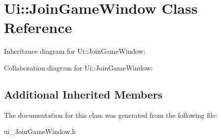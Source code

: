 \hypertarget{classUi_1_1JoinGameWindow}{}\section{Ui\+:\+:Join\+Game\+Window Class Reference}
\label{classUi_1_1JoinGameWindow}


Inheritance diagram for Ui\+:\+:Join\+Game\+Window\+:


Collaboration diagram for Ui\+:\+:Join\+Game\+Window\+:
\subsection*{Additional Inherited Members}


The documentation for this class was generated from the following file\+:\begin{DoxyCompactItemize}
\item 
ui\+\_\+\+Join\+Game\+Window.\+h\end{DoxyCompactItemize}
